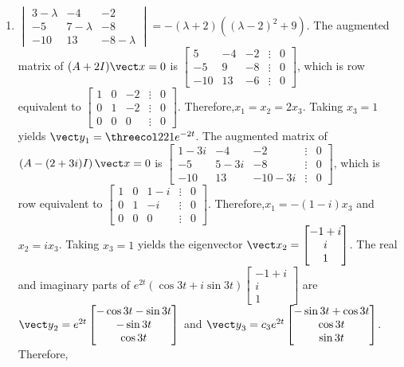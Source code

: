 \documentclass[openany]{book}
\newenvironment{sectionSolutions}{
 \begin{enumerate}[item-label={\thesection.\arabic{enumi}.}]
}{
 \end{enumerate}
}
\begin{document}
\begin{sectionSolutions}
\item
$\begin{vmatrix}3-\lambda&-4&-2\\-5&7-\lambda&-8\\-10
&13&-8-\lambda\end{vmatrix}=-(\lambda+2)\left((\lambda-2)^2+9\right)$.
 The augmented matrix of $(A+2I){\vect x=0}$ is
$\begin{bmatrix}5&-4&-2&\vdots&0\\-5&9&-8&\vdots&0\\
-10&13&-6&\vdots&0\end{bmatrix}$,
which is row equivalent to
$\begin{bmatrix} 1&0&-2&\vdots&0\\ 0&1&-2&
\vdots&0\\ 0&0&0&\vdots&0\end{bmatrix}$.
Therefore,$x_1=x_2=2x_3$.  Taking $x_3=1$ yields
${\vect y}_1=\threecol221e^{-2t}$.
The augmented matrix of
$\left(A-(2+3i)I\right){\vect x=0}$ is
$\begin{bmatrix}1-3i&-4&-2&\vdots&0\\-5&5-3i&-8&\vdots&0\\
-10&13&-10-3i&\vdots&0\end{bmatrix}$,
which is row equivalent to
$\begin{bmatrix} 1&0&1-i&\vdots&0\\
0&1&-i&\vdots&0\\ 0&0&0&\vdots&0\end{bmatrix}$.
Therefore,$x_1=-(1-i)x_3$ and $x_2=ix_3$.
Taking $x_3=1$ yields the eigenvector
${\vect x}_2=\begin{bmatrix}-1+i\\i\\1\end{bmatrix}$.
The real and imaginary parts of $e^{2t}(\cos3t+i\sin3t)
\begin{bmatrix}-1+i\\i\\1\end{bmatrix}$ are
${\vect y}_2=e^{2t}\begin{bmatrix}-\cos3t-\sin3t\\-\sin3t\\
\cos3t\end{bmatrix}$ and ${\vect y}_3=
c_3e^{2t}\begin{bmatrix}-\sin3t+\cos3t\\\cos3t\\
\sin3t\end{bmatrix}$. Therefore,

\end{sectionSolutions}
\end{document}
